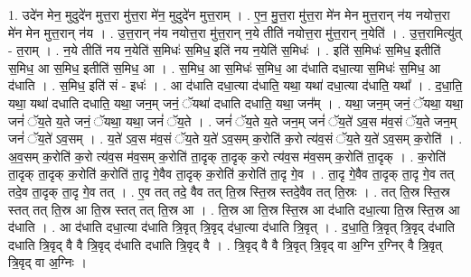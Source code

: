 \documentclass[17pt]{extarticle}
\begin{document}
1. उदे॑न मेन॒ मुदुदे॑न मुत्त॒रा मु॑त्त॒रा मे॑न॒ मुदुदे॑न मुत्त॒राम् । . ए॒न॒ मु॒त्त॒रा मु॑त्त॒रा मे॑न मेन मुत्त॒रान् न॑य नयोत्त॒रा मे॑न मेन मुत्त॒रान् न॑य । . उ॒त्त॒रान् न॑य नयोत्त॒रा मु॑त्त॒रान् न॒ये तीति॑ नयोत्त॒रा मु॑त्त॒रान् न॒येति॑ । . उ॒त्त॒रामित्यु॑त् - त॒राम् । . न॒ये तीति॑ नय न॒येति॑ स॒मिधः॑ स॒मिध॒ इति॑ नय न॒येति॑ स॒मिधः॑ । . इति॑ स॒मिधः॑ स॒मिध॒ इतीति॑ स॒मिध॒ आ स॒मिध॒ इतीति॑ स॒मिध॒ आ । . स॒मिध॒ आ स॒मिधः॑ स॒मिध॒ आ द॑धाति दधा॒त्या स॒मिधः॑ स॒मिध॒ आ द॑धाति । . स॒मिध॒ इति॑ सं - इधः॑ । . आ द॑धाति दधा॒त्या द॑धाति॒ यथा॒ यथा॑ दधा॒त्या द॑धाति॒ यथा᳚ । . द॒धा॒ति॒ यथा॒ यथा॑ दधाति दधाति॒ यथा॒ जन॒म् जनं॒ ॅयथा॑ दधाति दधाति॒ यथा॒ जन᳚म् । . यथा॒ जन॒म् जनं॒ ॅयथा॒ यथा॒ जनं॑ ॅय॒ते य॒ते जनं॒ ॅयथा॒ यथा॒ जनं॑ ॅय॒ते । . जनं॑ ॅय॒ते य॒ते जन॒म् जनं॑ ॅय॒ते॑ ऽव॒स म॑व॒सं ॅय॒ते जन॒म् जनं॑ ॅय॒ते॑ ऽव॒सम् । . य॒ते॑ ऽव॒स म॑व॒सं ॅय॒ते य॒ते॑ ऽव॒सम् क॒रोति॑ क॒रो त्य॑व॒सं ॅय॒ते य॒ते॑ ऽव॒सम् क॒रोति॑ । . अ॒व॒सम् क॒रोति॑ क॒रो त्य॑व॒स म॑व॒सम् क॒रोति॑ ता॒दृक् ता॒दृक् क॒रो त्य॑व॒स म॑व॒सम् क॒रोति॑ ता॒दृक् । . क॒रोति॑ ता॒दृक् ता॒दृक् क॒रोति॑ क॒रोति॑ ता॒दृ गे॒वैव ता॒दृक् क॒रोति॑ क॒रोति॑ ता॒दृ गे॒व । . ता॒दृ गे॒वैव ता॒दृक् ता॒दृ गे॒व तत् तदे॒व ता॒दृक् ता॒दृ गे॒व तत् । . ए॒व तत् तदे॒ वैव तत् ति॒स्र स्ति॒स्र स्तदे॒वैव तत् ति॒स्रः । . तत् ति॒स्र स्ति॒स्र स्तत् तत् ति॒स्र आ ति॒स्र स्तत् तत् ति॒स्र आ । . ति॒स्र आ ति॒स्र स्ति॒स्र आ द॑धाति दधा॒त्या ति॒स्र स्ति॒स्र आ द॑धाति । . आ द॑धाति दधा॒त्या द॑धाति त्रि॒वृत् त्रि॒वृद् द॑धा॒त्या द॑धाति त्रि॒वृत् । . द॒धा॒ति॒ त्रि॒वृत् त्रि॒वृद् द॑धाति दधाति त्रि॒वृद् वै वै त्रि॒वृद् द॑धाति दधाति त्रि॒वृद् वै । . त्रि॒वृद् वै वै त्रि॒वृत् त्रि॒वृद् वा अ॒ग्नि र॒ग्निर् वै त्रि॒वृत् त्रि॒वृद् वा अ॒ग्निः । \newline
\end{document}
